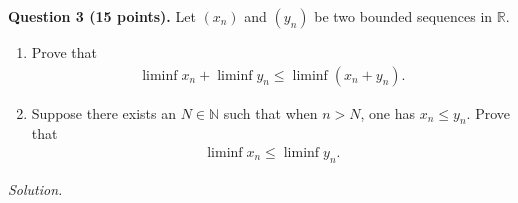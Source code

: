 \documentclass[11pt]{amsart}
\theoremstyle{plain}
\numberwithin{equation}{section}
\begin{document}
\newpage\noindent\textbf{Question 3 (15 points).} Let $\left(x_{n}\right)$ and $\left(y_{n}\right)$ be two bounded sequences in $\mathbb{R}$. 
\begin{enumerate}[label=\textbf{(\roman*)}]
    \itemsep 0em
    \item Prove that
\begin{align*}
    \liminf x_{n}+\liminf y_{n}\leq\liminf\left(x_{n}+y_{n}\right).
\end{align*} %
\item Suppose there exists an $N\in\mathbb{N}$ such that when $n>N$, one has $x_{n}\leq y_{n}$. Prove that
\begin{align*}
    \liminf x_{n}\leq\liminf y_{n}.
\end{align*}
\end{enumerate}
\noindent\emph{Solution.}
\end{document}
